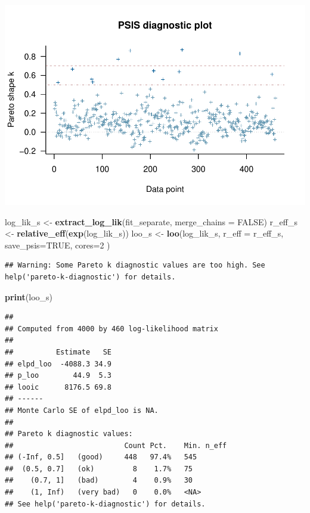 \documentclass[]{article}
\newenvironment{Shaded}{\begin{snugshade}}{\end{snugshade}}
\newcommand{\KeywordTok}[1]{\textcolor[rgb]{0.13,0.29,0.53}{\textbf{#1}}}
\newcommand{\DataTypeTok}[1]{\textcolor[rgb]{0.13,0.29,0.53}{#1}}
\newcommand{\DecValTok}[1]{\textcolor[rgb]{0.00,0.00,0.81}{#1}}
\newcommand{\StringTok}[1]{\textcolor[rgb]{0.31,0.60,0.02}{#1}}
\newcommand{\OtherTok}[1]{\textcolor[rgb]{0.56,0.35,0.01}{#1}}
\newcommand{\NormalTok}[1]{#1}
\begin{document}
\includegraphics{Data_science_project_files/figure-latex/unnamed-chunk-14-1.pdf}

\begin{Shaded}
\begin{Highlighting}[]
\NormalTok{log_lik_s <-}\StringTok{ }\KeywordTok{extract_log_lik}\NormalTok{(fit_separate, }\DataTypeTok{merge_chains =} \OtherTok{FALSE}\NormalTok{)}
\NormalTok{r_eff_s <-}\StringTok{ }\KeywordTok{relative_eff}\NormalTok{(}\KeywordTok{exp}\NormalTok{(log_lik_s))}
\NormalTok{loo_s <-}\StringTok{ }\KeywordTok{loo}\NormalTok{(log_lik_s, }\DataTypeTok{r_eff =}\NormalTok{ r_eff_s, }\DataTypeTok{save_psis=}\OtherTok{TRUE}\NormalTok{, }\DataTypeTok{cores=}\DecValTok{2}\NormalTok{ )}
\end{Highlighting}
\end{Shaded}

\begin{verbatim}
## Warning: Some Pareto k diagnostic values are too high. See help('pareto-k-diagnostic') for details.
\end{verbatim}

\begin{Shaded}
\begin{Highlighting}[]
\KeywordTok{print}\NormalTok{(loo_s)}
\end{Highlighting}
\end{Shaded}

\begin{verbatim}
## 
## Computed from 4000 by 460 log-likelihood matrix
## 
##          Estimate   SE
## elpd_loo  -4088.3 34.9
## p_loo        44.9  5.3
## looic      8176.5 69.8
## ------
## Monte Carlo SE of elpd_loo is NA.
## 
## Pareto k diagnostic values:
##                          Count Pct.    Min. n_eff
## (-Inf, 0.5]   (good)     448   97.4%   545       
##  (0.5, 0.7]   (ok)         8    1.7%   75        
##    (0.7, 1]   (bad)        4    0.9%   30        
##    (1, Inf)   (very bad)   0    0.0%   <NA>      
## See help('pareto-k-diagnostic') for details.
\end{verbatim}
\end{document}
